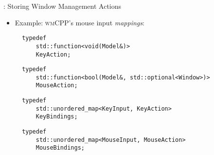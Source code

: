 \begin{frame}[fragile]{\underline{\cpp}: Storing Window Management Actions \hfill {\footnotesize \currentname}}


    \begin{itemize}

        \item Example: \textsc{wmCPP}'s mouse input \textit{mappings}:\\[3pt]
\begin{verbatim}
  typedef
      std::function<void(Model&)>
      KeyAction;
\end{verbatim}
\begin{verbatim}
  typedef
      std::function<bool(Model&, std::optional<Window>)>
      MouseAction;
\end{verbatim}
\begin{verbatim}
  typedef
      std::unordered_map<KeyInput, KeyAction>
      KeyBindings;
\end{verbatim}
\begin{verbatim}
  typedef
      std::unordered_map<MouseInput, MouseAction>
      MouseBindings;
\end{verbatim}

    \end{itemize}

    \vfill

\end{frame}

